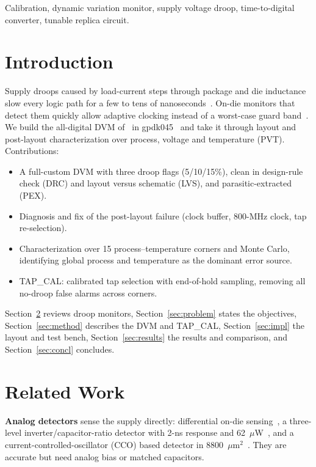\documentclass[conference]{IEEEtran}
\begin{document}
\begin{IEEEkeywords}
Calibration, dynamic variation monitor, supply voltage droop, time-to-digital converter, tunable replica circuit.
\end{IEEEkeywords}

\section{Introduction}
Supply droops caused by load-current steps through package and die inductance slow every logic path for a few to tens of nanoseconds~\cite{muhtaroglu,whatmough_jssc}. On-die monitors that detect them quickly allow adaptive clocking instead of a worst-case guard band~\cite{bowman_tcas,tschanz_trc}. We build the all-digital DVM of~\cite{bowman_cicc,bowman_tcas} in gpdk045~\cite{gpdk045} and take it through layout and post-layout characterization over process, voltage and temperature (PVT). Contributions:
\begin{itemize}
\item A full-custom DVM with three droop flags (5/10/15\%), clean in design-rule check (DRC) and layout versus schematic (LVS), and parasitic-extracted (PEX).
\item Diagnosis and fix of the post-layout failure (clock buffer, 800-MHz clock, tap re-selection).
\item Characterization over 15 process--temperature corners and Monte Carlo, identifying global process and temperature as the dominant error source.
\item TAP\_CAL: calibrated tap selection with end-of-hold sampling, removing all no-droop false alarms across corners.
\end{itemize}
Section~\ref{sec:related} reviews droop monitors, Section~\ref{sec:problem} states the objectives, Section~\ref{sec:method} describes the DVM and TAP\_CAL, Section~\ref{sec:impl} the layout and test bench, Section~\ref{sec:results} the results and comparison, and Section~\ref{sec:concl} concludes.

\section{Related Work}\label{sec:related}
\textbf{Analog detectors} sense the supply directly: differential on-die sensing~\cite{muhtaroglu}, a three-level inverter/capacitor-ratio detector with 2-ns response and 62~$\mu$W~\cite{shifman}, and a current-controlled-oscillator (CCO) based detector in 8800~$\mu$m$^2$~\cite{mizrahi}. They are accurate but need analog bias or matched capacitors.
\end{document}
